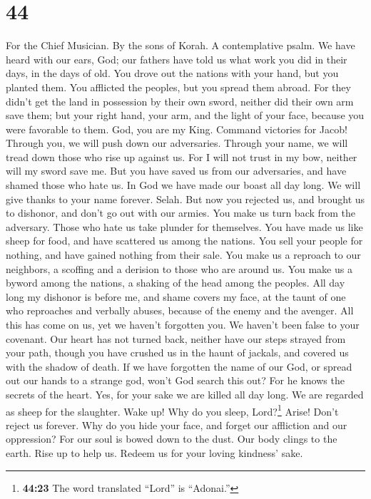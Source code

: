 \hypertarget{section-43}{%
\section{44}\label{section-43}}

For the Chief Musician. By the sons of Korah. A contemplative psalm.
 We have heard with our ears, God; our fathers have told
us what work you did in their days, in the days of old. 
You drove out the nations with your hand, but you planted them. You
afflicted the peoples, but you spread them abroad.  For
they didn't get the land in possession by their own sword, neither did
their own arm save them; but your right hand, your arm, and the light of
your face, because you were favorable to them.  God, you
are my King. Command victories for Jacob!  Through you, we
will push down our adversaries. Through your name, we will tread down
those who rise up against us.  For I will not trust in my
bow, neither will my sword save me.  But you have saved us
from our adversaries, and have shamed those who hate us. 
In God we have made our boast all day long. We will give thanks to your
name forever. Selah.  But now you rejected us, and brought
us to dishonor, and don't go out with our armies.  You
make us turn back from the adversary. Those who hate us take plunder for
themselves.  You have made us like sheep for food, and
have scattered us among the nations.  You sell your
people for nothing, and have gained nothing from their sale.
 You make us a reproach to our neighbors, a scoffing and
a derision to those who are around us.  You make us a
byword among the nations, a shaking of the head among the peoples.
 All day long my dishonor is before me, and shame covers
my face,  at the taunt of one who reproaches and verbally
abuses, because of the enemy and the avenger.  All this
has come on us, yet we haven't forgotten you. We haven't been false to
your covenant.  Our heart has not turned back, neither
have our steps strayed from your path,  though you have
crushed us in the haunt of jackals, and covered us with the shadow of
death.  If we have forgotten the name of our God, or
spread out our hands to a strange god,  won't God search
this out? For he knows the secrets of the heart.  Yes,
for your sake we are killed all day long. We are regarded as sheep for
the slaughter.  Wake up! Why do you sleep,
Lord?\footnote{\textbf{44:23} The word translated ``Lord'' is
  ``Adonai.''} Arise! Don't reject us forever.  Why do
you hide your face, and forget our affliction and our oppression?
 For our soul is bowed down to the dust. Our body clings
to the earth.  Rise up to help us. Redeem us for your
loving kindness' sake.

